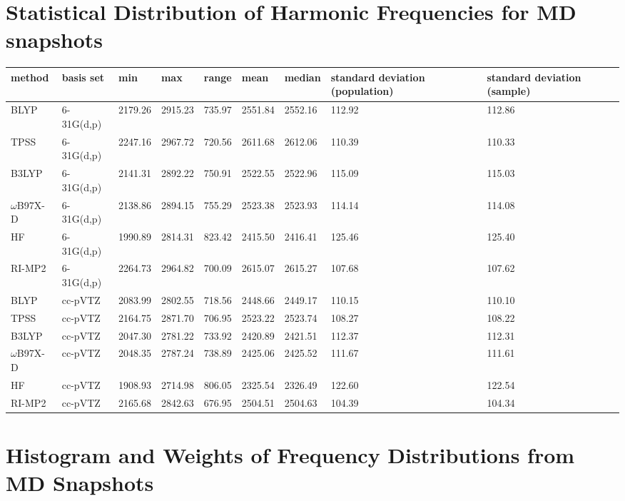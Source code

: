 \section{Statistical Distribution of Harmonic Frequencies for MD snapshots}
\label{paper_02:sec:SI}

\begin{table}[h]
  \centering
  \caption[Descriptive statistics for  asymmetric stretch frequencies from MD]{Statistics for dependence of  asymmetric stretch frequencies on quantum chemical method and basis set dependence on \num{1000} MD snapshots, 0 QM/256 MM. All frequencies in \si{\wavenumber}.}
  \label{paper_02:tab:S1}
  \begin{longtable}[]{@{}lllllllll@{}}
    \toprule
    \textbf{method} & \textbf{basis set} & \textbf{min} & \textbf{max} & \textbf{range} & \textbf{mean} & \textbf{median} & \textbf{standard deviation (population)} & \textbf{standard deviation (sample)}\tabularnewline
    \midrule
    \endhead
    BLYP & 6-31G(d,p) & 2179.26 & 2915.23 & 735.97 & 2551.84 & 2552.16 & 112.92 & 112.86\tabularnewline
    TPSS & 6-31G(d,p) & 2247.16 & 2967.72 & 720.56 & 2611.68 & 2612.06 & 110.39 & 110.33\tabularnewline
    B3LYP & 6-31G(d,p) & 2141.31 & 2892.22 & 750.91 & 2522.55 & 2522.96 & 115.09 & 115.03\tabularnewline
    \(\omega\)B97X-D & 6-31G(d,p) & 2138.86 & 2894.15 & 755.29 & 2523.38 & 2523.93 & 114.14 & 114.08\tabularnewline
    HF & 6-31G(d,p) & 1990.89 & 2814.31 & 823.42 & 2415.50 & 2416.41 & 125.46 & 125.40\tabularnewline
    RI-MP2 & 6-31G(d,p) & 2264.73 & 2964.82 & 700.09 & 2615.07 & 2615.27 & 107.68 & 107.62\tabularnewline
    BLYP & cc-pVTZ & 2083.99 & 2802.55 & 718.56 & 2448.66 & 2449.17 & 110.15 & 110.10\tabularnewline
    TPSS & cc-pVTZ & 2164.75 & 2871.70 & 706.95 & 2523.22 & 2523.74 & 108.27 & 108.22\tabularnewline
    B3LYP & cc-pVTZ & 2047.30 & 2781.22 & 733.92 & 2420.89 & 2421.51 & 112.37 & 112.31\tabularnewline
    \(\omega\)B97X-D & cc-pVTZ & 2048.35 & 2787.24 & 738.89 & 2425.06 & 2425.52 & 111.67 & 111.61\tabularnewline
    HF & cc-pVTZ & 1908.93 & 2714.98 & 806.05 & 2325.54 & 2326.49 & 122.60 & 122.54\tabularnewline
    RI-MP2 & cc-pVTZ & 2165.68 & 2842.63 & 676.95 & 2504.51 & 2504.63 & 104.39 & 104.34\tabularnewline
    \bottomrule
  \end{longtable}
\end{table}

\section{Histogram and Weights of Frequency Distributions from MD Snapshots}
\label{paper_02:sec:SII}

